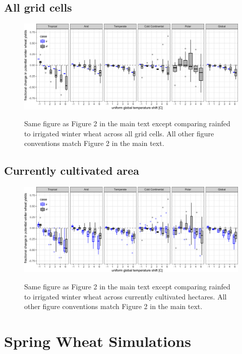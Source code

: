 \documentclass[10pt]{article}
\begin{document}
\subsection{All grid cells}
\begin{figure}[h!]
\includegraphics[width=\textwidth]{s_winter_wheat_sim_CG.png}\\
\caption{Same figure as Figure 2 in the main text except comparing rainfed to irrigated winter wheat across all grid cells. All other figure conventions match Figure 2 in the main text.}
\label{fig:maizeCG}
\end{figure}

\subsection{Currently cultivated area}
\begin{figure}[h!]
\includegraphics[width=\textwidth]{s_winter_wheat_sim_CG_area_weight.png}\\
\caption{Same figure as Figure 2 in the main text except comparing rainfed to irrigated winter wheat across currently cultivated hectares. All other figure conventions match Figure 2 in the main text.}
\label{fig:maizeCG}
\end{figure}

\clearpage
\section{Spring Wheat Simulations}
\end{document}
